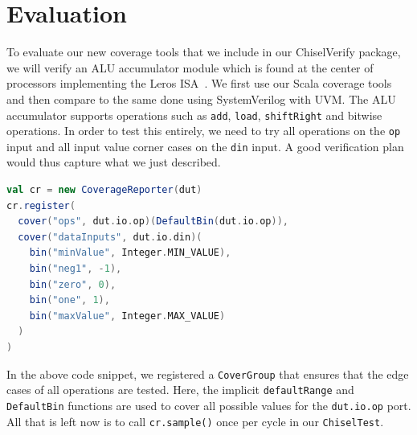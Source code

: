 \documentclass[conference]{IEEEtran}
\newcommand{\todo}[1]{{\color{olive} TODO: #1}}
\newcommand{\martin}[1]{{\color{blue} Martin: #1}}
\newcommand{\hjd}[1]{{\color{pink} Hans: #1}}
\begin{document}
\section{Evaluation}
To evaluate our new coverage tools that we include in our ChiselVerify package, we will verify an ALU accumulator module which is found at the center of processors implementing the Leros ISA~\cite{leros:comp:2019}. We first use our Scala coverage tools and then compare to the same done using SystemVerilog with UVM. %
 The ALU accumulator supports operations such as \texttt{add}, \texttt{load}, \texttt{shiftRight} and bitwise operations. %
 In order to test this entirely, we need to try all operations on the \texttt{op} input and all input value corner cases on the \texttt{din} input. %
 A good verification plan would thus capture what we just described.  
\begin{lstlisting}[language=scala] 
val cr = new CoverageReporter(dut)  
cr.register(
  cover("ops", dut.io.op)(DefaultBin(dut.io.op)),
  cover("dataInputs", dut.io.din)(
    bin("minValue", Integer.MIN_VALUE),
    bin("neg1", -1),
    bin("zero", 0),
    bin("one", 1),
    bin("maxValue", Integer.MAX_VALUE)
  )
)
\end{lstlisting}
In the above code snippet, we registered a \texttt{CoverGroup} that ensures that the edge cases of all operations are tested.
Here, the implicit \texttt{defaultRange} and \texttt{DefaultBin} functions are used to cover all possible values for the \texttt{dut.io.op} port.
All that is left now is to call \texttt{cr.sample()} once per cycle in our \texttt{ChiselTest}.
\end{document}
